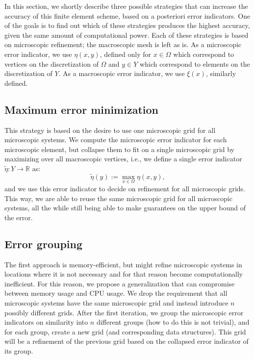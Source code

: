 \documentclass{article}
\newcommand{\R}{\mathbb{ R}}
\begin{document}
In this section, we shortly describe three possible strategies that can increase the accuracy of this finite element scheme, based on a posteriori error indicators.
One of the goals is to find out which of these strategies produces the highest accuracy, given the same amount of computational power.
Each of these strategies is based on microscopic refinement; the macroscopic mesh is left as is.
As a microscopic error indicator, we use $\eta(x,y)$, defined only for $x \in \Omega$ which correspond to vertices on the discretization of $\Omega$ and $y \in Y$ which correspond to elements on the discretization of $Y$.
As a macroscopic error indicator, we use $\xi(x)$, similarly defined.

\subsection{Maximum error minimization}
\label{sec:max_min}
This strategy is based on the desire to use one microscopic grid for all microscopic systems.
We compute the microscopic error indicator for each microscopic element, but collapse them to fit on a single microscopic grid by maximizing over all macroscopic vertices, i.e., we define a single error indicator $\tilde{\eta}:Y \to \R$ as:
\begin{equation}
    \tilde{\eta}(y) := \max_{x\in \Omega} \eta(x,y),
\end{equation}
and we use this error indicator to decide on refinement for all microscopic grids.
This way, we are able to reuse the same microscopic grid for all microscopic systems, all the while still being able to make guarantees on the upper bound of the error.
\subsection{Error grouping}
\label{sec:error_grouping}
The first approach is memory-efficient, but might refine microscopic systems in locations where it is not necessary and for that reason become computationally inefficient.
For this reason, we propose a generalization that can compromise between memory usage and CPU usage.
We drop the requirement that all microscopic systems have the same microscopic grid and instead introduce $n$ possibly different grids.
After the first iteration, we group the microscopic error indicators on similarity into $n$ different groups (how to do this is not trivial), and for each group, create a new grid (and corresponding data structures).
This grid will be a refinement of the previous grid based on the collapsed error indicator of its group.
\end{document}
